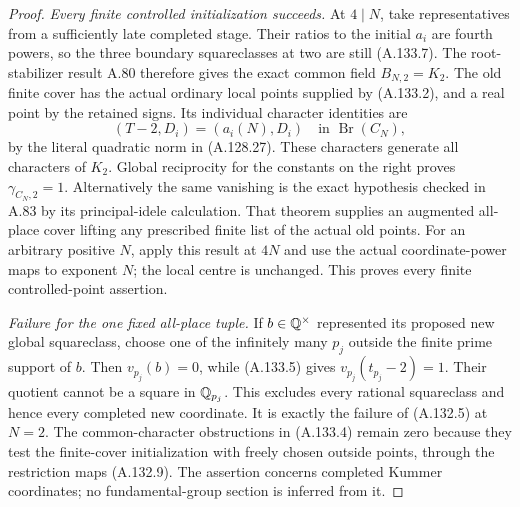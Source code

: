 \begin{proof}
\emph{Every finite controlled initialization succeeds.}
At \(4\mid N\), take representatives from a
sufficiently late completed stage.
Their ratios to the initial \(a_i\) are fourth
powers, so the three boundary squareclasses at
two are still (A.133.7).
The root-stabilizer result A.80 therefore gives
the exact common field \(B_{N,2}=K_2\).
The old finite cover has the actual ordinary local
points supplied by (A.133.2), and a real point by
the retained signs.
Its individual character identities are
\[
             (T-2,D_i)=(a_i(N),D_i)
                                  \quad\text{in }\operatorname{Br}(C_N),
\tag{A.133.20}
\]
by the literal quadratic norm in (A.128.27).
These characters generate all characters of \(K_2\).
Global reciprocity for the constants on the right
proves \(\gamma_{C_N,2}=1\).
Alternatively the same vanishing is the exact
hypothesis checked in A.83 by its principal-idele
calculation.
That theorem supplies an augmented all-place cover
lifting any prescribed finite list of the actual
old points.
For an arbitrary positive \(N\), apply this result
at \(4N\) and use the actual coordinate-power maps
to exponent \(N\); the local centre is unchanged.
This proves every finite controlled-point assertion.

\emph{Failure for the one fixed all-place tuple.}
If \(b\in\mathbb Q^\times\) represented its proposed new
global squareclass, choose one of the infinitely
many \(p_j\) outside the finite prime support of \(b\).
Then \(v_{p_j}(b)=0\), while (A.133.5) gives
\(v_{p_j}(t_{p_j}-2)=1\).
Their quotient cannot be a square in \(\mathbb Q_{p_j}\).
This excludes every rational squareclass and hence
every completed new coordinate.
It is exactly the failure of (A.132.5) at \(N=2\).
The common-character obstructions in (A.133.4)
remain zero because they test the finite-cover
initialization with freely chosen outside points,
through the restriction maps (A.132.9).
The assertion concerns completed Kummer coordinates;
no fundamental-group section is inferred from it.


\end{proof}
